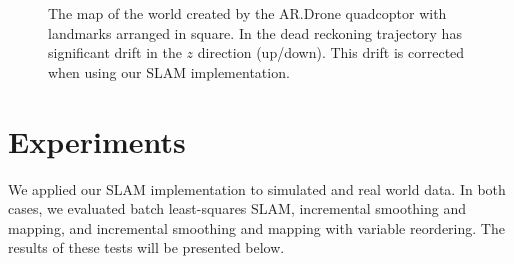 \documentclass[conference]{IEEEtran}
\begin{document}
\begin{figure}[t]
  \begin{center}
    \caption{The map of the world created by the AR.Drone quadcoptor with landmarks
      arranged in square.  In  the dead reckoning trajectory has
      significant drift in the $z$ direction (up/down).  This drift is corrected when
      using our SLAM implementation.}
    \label{fig:mapadjustment}
  \end{center}
\end{figure}



\section{Experiments}
\label{sec:experiments}

We applied our SLAM implementation to simulated and real world data. In both cases, we
evaluated batch least-squares SLAM, incremental smoothing and mapping, and incremental
smoothing and mapping with variable reordering. The results of these tests will be
presented below.
\end{document}
